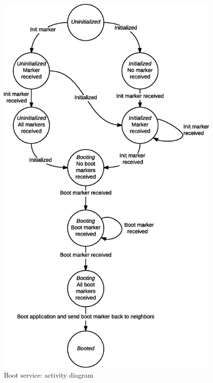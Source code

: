 \begin{figure}[H]
  \centering
  \includegraphics[width=.8\columnwidth]{images/solution/mw/boot.eps}
  \caption{Boot service: activity diagram}
  \label{fig:mw-boot}
\end{figure}
